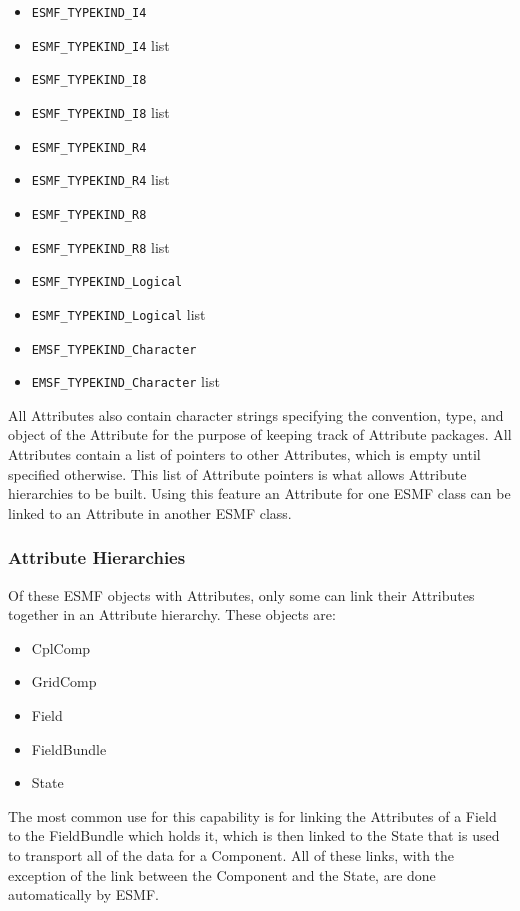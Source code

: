 \begin{itemize}
\item {\tt ESMF\_TYPEKIND\_I4}
\item {\tt ESMF\_TYPEKIND\_I4} list
\item {\tt ESMF\_TYPEKIND\_I8}
\item {\tt ESMF\_TYPEKIND\_I8} list
\item {\tt ESMF\_TYPEKIND\_R4}
\item {\tt ESMF\_TYPEKIND\_R4} list
\item {\tt ESMF\_TYPEKIND\_R8}
\item {\tt ESMF\_TYPEKIND\_R8} list
\item {\tt ESMF\_TYPEKIND\_Logical}
\item {\tt ESMF\_TYPEKIND\_Logical} list
\item {\tt EMSF\_TYPEKIND\_Character}
\item {\tt EMSF\_TYPEKIND\_Character} list
\end{itemize}

All Attributes also contain character strings specifying the convention, type, and object of the Attribute for the purpose of keeping track of Attribute packages.  All Attributes contain a list of pointers to other Attributes, which is empty until specified otherwise.  This list of Attribute pointers is what allows Attribute hierarchies to be built.  Using this feature an Attribute for one ESMF class can be linked to an Attribute in another ESMF class.

\subsubsection{Attribute Hierarchies}

Of these ESMF objects with Attributes, only some can link their Attributes together in an Attribute hierarchy.  These objects are:

\begin{itemize}
\item CplComp
\item GridComp
\item Field
\item FieldBundle
\item State
\end{itemize}

The most common use for this capability is for linking the Attributes of a Field to the FieldBundle which holds it, which is then linked to the State that is used to transport all of the data for a Component.  All of these links, with the exception of the link between the Component and the State, are done automatically by ESMF.  

